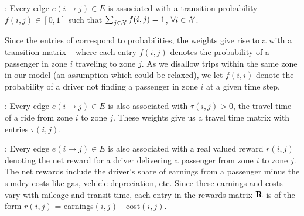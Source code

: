 
\begin{comment} %
\spara{Count matrix (\countmatrix)}: 
Every edge $e(i\rightarrow j) \in E$ is associated with an
integer-valued weight $c(i,j)$ that denotes the number of requests
at zone $i$ that had node $j$ as their destination.
\end{comment}

:
Every edge $e(i\rightarrow j) \in E$ is associated with a transition probability
$f(i, j) \in [0,1]$ such that
$\sum_{j \in \mathcal{X}} f(i,j) = 1$, $\forall i \in \mathcal{X}$.  

Since the entries of {\empiricaltransitionmatrix} correspond to probabilities, the weights 
give rise to a {\markovchain} with a transition matrix {\empiricaltransitionmatrix} -- 
where each entry $f(i,j)$ denotes the probability of a passenger in zone $i$
traveling to zone $j$. 
As we disallow trips within the same zone in our model (an assumption which could be relaxed), 
  we let $f(i,i)$ denote the probability of a driver not finding a passenger in zone $i$ at a
given time step.


:
Every edge $e(i\rightarrow j) \in E$ is also associated with  $\tau(i,j) > 0$, 
 the travel time of a ride from zone $i$ to zone $j$. 
These weights give us a travel time matrix {\traveltimematrix} with entries $\tau(i,j)$. 


:
Every edge $e(i \rightarrow j) \in E$ is also associated with a real valued reward $r(i,j)$ denoting
the net reward for a driver delivering a passenger from zone $i$ to zone $j$. The net rewards include the driver's
share of earnings from a passenger minus the sundry costs like gas, vehicle depreciation, etc.  Since these
earnings and costs vary with mileage and transit time, each entry in the rewards matrix ${\mathbf{R}}$ 
is of the form $r(i,j)$ = earnings$(i,j)$ - cost$(i,j)$.


